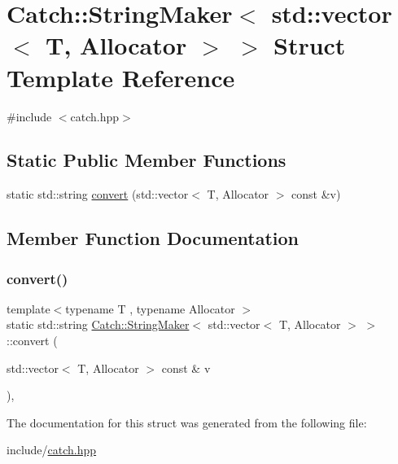 \hypertarget{structCatch_1_1StringMaker_3_01std_1_1vector_3_01T_00_01Allocator_01_4_01_4}{}\section{Catch\+:\+:String\+Maker$<$ std\+:\+:vector$<$ T, Allocator $>$ $>$ Struct Template Reference}
\label{structCatch_1_1StringMaker_3_01std_1_1vector_3_01T_00_01Allocator_01_4_01_4}


{\ttfamily \#include $<$catch.\+hpp$>$}

\subsection*{Static Public Member Functions}
\begin{DoxyCompactItemize}
\item 
static std\+::string \mbox{\hyperlink{structCatch_1_1StringMaker_3_01std_1_1vector_3_01T_00_01Allocator_01_4_01_4_adc7dc716733cea8777497257ae22e62d}{convert}} (std\+::vector$<$ T, Allocator $>$ const \&v)
\end{DoxyCompactItemize}


\subsection{Member Function Documentation}
\mbox{\label{structCatch_1_1StringMaker_3_01std_1_1vector_3_01T_00_01Allocator_01_4_01_4_adc7dc716733cea8777497257ae22e62d}} 
\subsubsection{\texorpdfstring{convert()}{convert()}}
{\footnotesize\ttfamily template$<$typename T , typename Allocator $>$ \\
static std\+::string \mbox{\hyperlink{structCatch_1_1StringMaker}{Catch\+::\+String\+Maker}}$<$ std\+::vector$<$ T, Allocator $>$ $>$\+::convert (\begin{DoxyParamCaption}\item[{std\+::vector$<$ T, Allocator $>$ const \&}]{v }\end{DoxyParamCaption})\hspace{0.3cm}{\ttfamily [inline]}, {\ttfamily [static]}}



The documentation for this struct was generated from the following file\+:\begin{DoxyCompactItemize}
\item 
include/\mbox{\hyperlink{catch_8hpp}{catch.\+hpp}}\end{DoxyCompactItemize}
